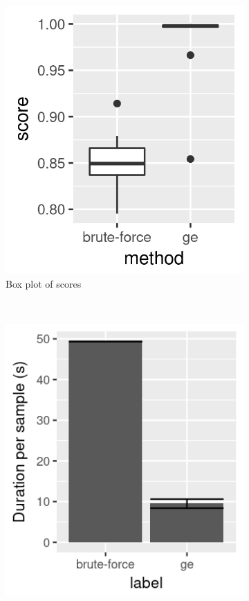 \begin{figure}
    \centering
    \begin{subfigure}{0.4\textwidth}
        \includegraphics[width=\textwidth]{figures/ge-random}
        \caption{Box plot of scores}
        \label{fig:ge-random}
    \end{subfigure}
    ~
    \begin{subfigure}{0.4\textwidth}
        \includegraphics[width=\textwidth]{figures/ge-random-duration}

\end{subfigure}
\end{figure}

